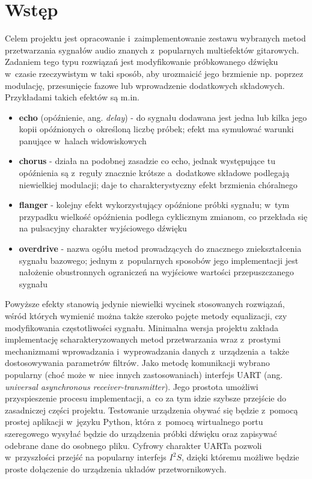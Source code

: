 \section{Wstęp}

Celem projektu jest opracowanie i~zaimplementowanie zestawu wybranych metod przetwarzania sygnałów audio znanych z~popularnych multiefektów gitarowych. Zadaniem tego typu rozwiązań jest modyfikowanie próbkowanego dźwięku w~czasie rzeczywistym w taki sposób, aby urozmaicić jego brzmienie np. poprzez modulację, przesunięcie fazowe lub wprowadzenie dodatkowych składowych. Przykładami takich efektów są m.in.

\begin{itemize}
    \item \textbf{echo} (opóźnienie, ang. \textit{delay}) - do sygnału dodawana jest jedna lub kilka jego kopii opóźnionych o~określoną liczbę próbek; efekt ma symulować warunki panujące w~halach widowiskowych
    \item \textbf{chorus} - działa na podobnej zasadzie co echo, jednak występujące tu opóźnienia są z~reguły znacznie krótsze a~dodatkowe składowe podlegają niewielkiej modulacji; daje to charakterystyczny efekt brzmienia chóralnego
    \item \textbf{flanger} - kolejny efekt wykorzystujący opóźnione próbki sygnału; w~tym przypadku wielkość opóźnienia podlega cyklicznym zmianom, co przekłada się na pulsacyjny charakter wyjściowego dźwięku
    \item \textbf{overdrive} - nazwa ogółu metod prowadzących do znacznego zniekształcenia sygnału bazowego; jednym z~popularnych sposobów jego implementacji jest nałożenie obustronnych ograniczeń na wyjściowe wartości przepuszczanego sygnału
\end{itemize}

Powyższe efekty stanowią jedynie niewielki wycinek stosowanych rozwiązań, wśród których wymienić można także szeroko pojęte metody equalizacji, czy modyfikowania częstotliwości sygnału. Minimalna wersja projektu zakłada implementację scharakteryzowanych metod przetwarzania wraz z~prostymi mechanizmami wprowadzania i~wyprowadzania danych z~urządzenia a~także dostosowywania parametrów filtrów. Jako metodę komunikacji wybrano popularny (choć może w~niec innych zastosowaniach) interfejs UART (ang. \textit{universal asynchronous receiver-transmitter}). Jego prostota umożliwi przyspieszenie procesu implementacji, a~co za tym idzie szybsze przejście do zasadniczej części projektu. Testowanie urządzenia obywać się będzie z~pomocą prostej aplikacji w~języku Python, która z~pomocą wirtualnego portu szeregowego wysyłać będzie do urządzenia próbki dźwięku oraz zapisywać odebrane dane do osobnego pliku. Cyfrowy charakter UARTa pozwoli w~przyszłości przejść na popularny interfejs $I^{2}S$, dzięki któremu możliwe będzie proste dołączenie do urządzenia układów przetwornikowych.

